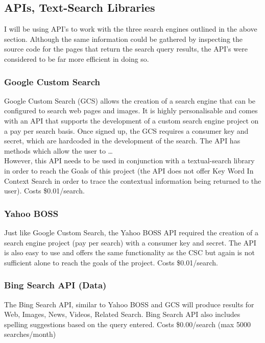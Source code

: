 \documentclass[10pt]{article}
\begin{document}
\subsection{APIs, Text-Search Libraries }
I will be using API’s to work with the three search engines outlined in the above section. Although the same information could be gathered by inspecting the source code for the pages that return the search query results, the API’s were considered to be far more efficient in doing so. 

\subsubsection{Google Custom Search}
Google Custom Search (GCS) allows the creation of a search engine that can be configured to search web pages and images. It is highly personalisable and comes with an API that supports the development of a custom search engine project on a pay per search basis. Once signed up, the GCS requires a consumer key and secret, which are hardcoded in the development of the search.
The API has methods which allow the user to …\\
However, this API needs to be used in conjunction with a textual-search library in order to reach the Goals of this project (the API does not offer Key Word In Context Search in order to trace the contextual information being returned to the user). Costs \$0.01/search.

\subsubsection{Yahoo BOSS}
Just like Google Custom Search, the Yahoo BOSS API required the creation of a search engine project (pay per search) with a consumer key and secret. The API is also easy to use and offers the same functionality as the CSC but again is not sufficient alone to reach the goals of the project. Costs \$0.01/search.

\subsubsection{Bing Search API (Data)}
The Bing Search API, similar to Yahoo BOSS and GCS will produce results for Web, Images, News, Videos, Related Search. Bing Search API also includes spelling suggestions based on the query entered. Costs \$0.00/search (max 5000 searches/month)
\end{document}

